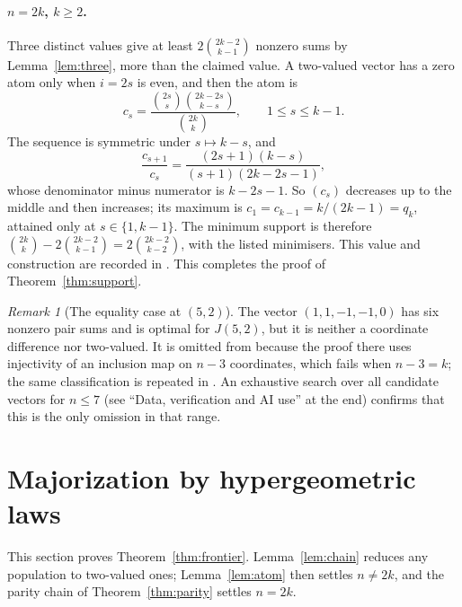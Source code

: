 \documentclass[11pt]{article}
\theoremstyle{remark}
\newtheorem{remark}[theorem]{Remark}
\begin{document}
\paragraph{\(n=2k\), \(k\ge2\).}
Three distinct values give at least \(2\binom{2k-2}{k-1}\) nonzero sums by
Lemma~\ref{lem:three}, more than the claimed value. A two-valued vector has a
zero atom only when \(i=2s\) is even, and then the atom is
\[
 c_s=\frac{\binom{2s}{s}\binom{2k-2s}{k-s}}{\binom{2k}{k}},\qquad1\le s\le k-1 .
\]
The sequence is symmetric under \(s\mapsto k-s\), and
\[
 \frac{c_{s+1}}{c_s}=\frac{(2s+1)(k-s)}{(s+1)(2k-2s-1)},
\]
whose denominator minus numerator is \(k-2s-1\). So \((c_s)\) decreases up to
the middle and then increases; its maximum is \(c_1=c_{k-1}=k/(2k-1)=q_k\),
attained only at \(s\in\{1,k-1\}\). The minimum support is therefore
\(\binom{2k}{k}-2\binom{2k-2}{k-1}=2\binom{2k-2}{k-2}\), with the listed
minimisers. This value and construction are recorded in
\cite[Section~5]{MVV}. This completes the proof of Theorem~\ref{thm:support}.

\begin{remark}[The equality case at \((5,2)\)]\label{rem:52}
The vector \((1,1,-1,-1,0)\) has six nonzero pair sums and is optimal for
\(J(5,2)\), but it is neither a coordinate difference nor two-valued. It is
omitted from \cite[Theorem~1]{MVV} because the proof there uses injectivity of
an inclusion map on \(n-3\) coordinates, which fails when \(n-3=k\); the same
classification is repeated in \cite[Theorem~5]{SV}. An exhaustive search over
all candidate vectors for \(n\le7\) (see ``Data, verification and AI use'' at the end) confirms that
this is the only omission in that range.
\end{remark}

\section{Majorization by hypergeometric laws}\label{sec:maj}

This section proves Theorem~\ref{thm:frontier}. Lemma~\ref{lem:chain} reduces
any population to two-valued ones; Lemma~\ref{lem:atom} then settles
\(n\ne2k\), and the parity chain of Theorem~\ref{thm:parity} settles \(n=2k\).
\end{document}
